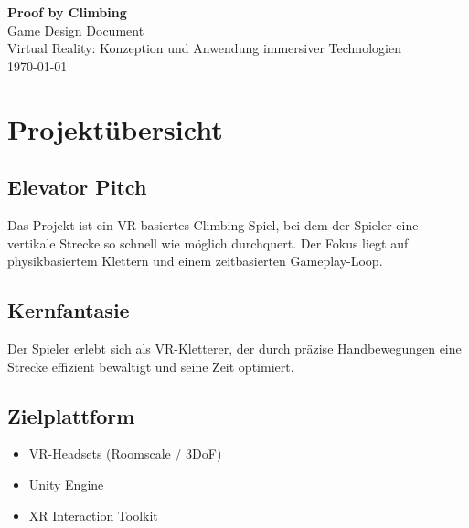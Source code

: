 \documentclass[11pt,a4paper]{article}
\begin{document}
\begin{titlepage}
    \centering
    \vspace*{2cm}

    {\Huge\bfseries\color{accent} Proof by Climbing}\\[0.5em]
    {\Large Game Design Document}\\[2cm]

    {\large Virtual Reality: Konzeption und Anwendung immersiver Technologien}\\[0.3em]

    \vfill
    {\large \today}
\end{titlepage}

\tableofcontents
\newpage

\section{Projektübersicht}

\subsection{Elevator Pitch}

Das Projekt ist ein VR-basiertes Climbing-Spiel, bei dem der Spieler eine vertikale Strecke so schnell wie möglich durchquert. Der Fokus liegt auf physikbasiertem Klettern und einem zeitbasierten Gameplay-Loop.

\subsection{Kernfantasie}

Der Spieler erlebt sich als VR-Kletterer, der durch präzise Handbewegungen eine Strecke effizient bewältigt und seine Zeit optimiert.

\subsection{Zielplattform}

\begin{itemize}
    \item VR-Headsets (Roomscale / 3DoF)
    \item Unity Engine
    \item XR Interaction Toolkit
\end{itemize}

\end{document}
